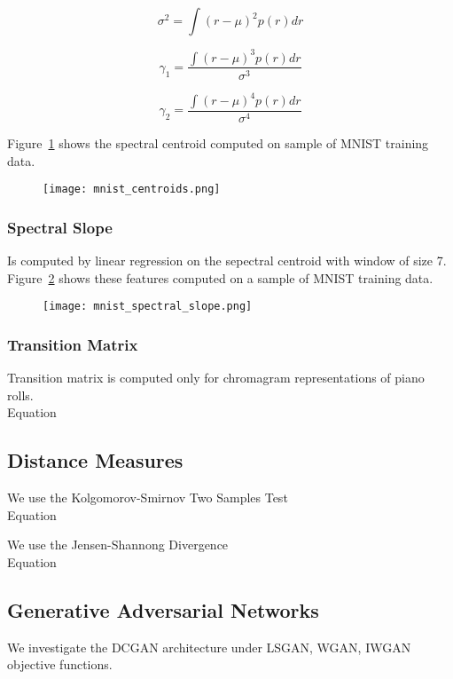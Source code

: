 \begin{equation}
    \sigma^2 = \int (r - \mu)^2 p(r) dr
\end{equation}

\begin{equation}
    \gamma_1 = \frac{\int (r - \mu)^3 p(r) dr}{\sigma^3}
\end{equation}

\begin{equation}
    \gamma_2 = \frac{\int (r - \mu)^4 p(r) dr}{\sigma^4}
\end{equation}

Figure~\ref{fig:mnist_centroids} shows the spectral centroid computed
on sample of MNIST training data.

\begin{figure}[!h]
  \texttt{[image: mnist\_centroids.png]}
  \caption{}
  \label{fig:mnist_centroids}
\end{figure}

\subsubsection{Spectral Slope}
Is computed by linear regression on the sepectral centroid with window of size
7. Figure~\ref{fig:mnist_spectral_slope} shows these features computed on a
sample of MNIST training data.

\begin{figure}[!h]
  \texttt{[image: mnist\_spectral\_slope.png]}
  \caption{}
  \label{fig:mnist_spectral_slope}
\end{figure}

\subsubsection{Transition Matrix}
Transition matrix is computed only for chromagram representations of piano
rolls. \\
Equation

\subsection{Distance Measures}
We use the Kolgomorov-Smirnov Two Samples Test\\
Equation

We use the Jensen-Shannong Divergence\\
Equation

\subsection{Generative Adversarial Networks}
We investigate the DCGAN architecture under LSGAN, WGAN, IWGAN objective
functions.
